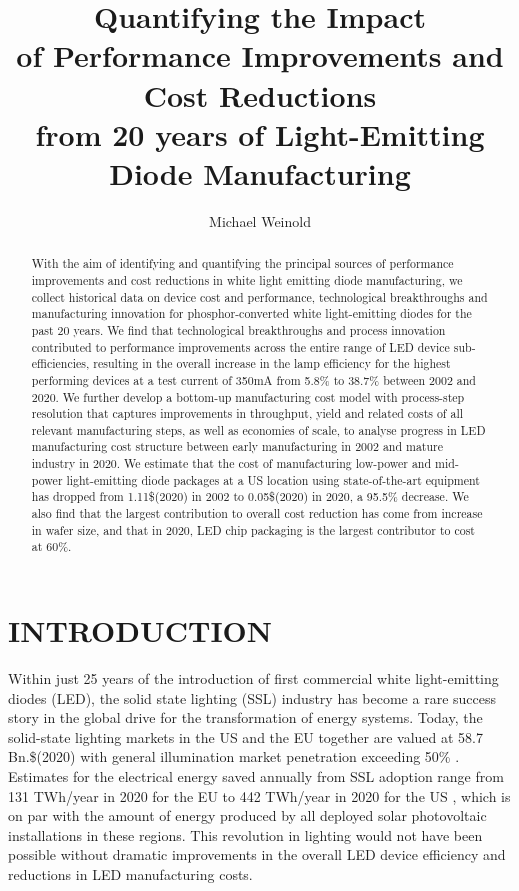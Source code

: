\documentclass[a4paper,nocompress]{spie}  %
\title{Quantifying the Impact \\ of Performance Improvements and Cost Reductions \\ from 20 years of Light-Emitting Diode Manufacturing}
\author[a,b]{Michael Weinold}
\begin{document}
\maketitle

\begin{abstract}
    
    With the aim of identifying and quantifying the principal sources of performance improvements and cost reductions in white light emitting diode manufacturing, we collect historical data on device cost and performance, technological breakthroughs and manufacturing innovation for phosphor-converted white light-emitting diodes for the past 20 years. We find that technological breakthroughs and process innovation contributed to performance improvements across the entire range of LED device sub-efficiencies, resulting in the overall increase in the lamp efficiency for the highest performing devices at a test current of 350mA from 5.8\% to 38.7\% between 2002 and 2020. We further develop a bottom-up manufacturing cost model with process-step resolution that captures improvements in throughput, yield and related costs of all relevant manufacturing steps, as well as economies of scale, to analyse progress in LED manufacturing cost structure between early manufacturing in 2002 and mature industry in 2020. We estimate that the cost of manufacturing low-power and mid-power light-emitting diode packages at a US location using state-of-the-art equipment has dropped from 1.11\$(2020) in 2002 to 0.05\$(2020) in 2020, a 95.5\% decrease. We also find that the largest contribution to overall cost reduction has come from increase in wafer size, and that in 2020, LED chip packaging is the largest contributor to cost at 60\%.

\end{abstract}


\section{INTRODUCTION}
\label{sec:intro}


    Within just 25 years of the introduction of first commercial white light-emitting diodes (LED), the solid state lighting (SSL) industry has become a rare success story in the global drive for the transformation of energy systems. Today, the solid-state lighting markets in the US and the EU together are valued at 58.7 Bn.\$(2020) \cite{gvr2020market_us,gvr2020market_eu} with general illumination market penetration exceeding 50\% \cite{eu2019impactass,stratunl2018}. Estimates for the electrical energy saved annually from SSL adoption range from 131 TWh/year in 2020 for the EU \cite{eu2019impactass} to 442 TWh/year in 2020 for the US \cite{yamada2015adoption,guidehouse2020adoption}, which is on par with the amount of energy produced by all deployed solar photovoltaic installations in these regions. This revolution in lighting would not have been possible without dramatic improvements in the overall LED device efficiency and reductions in LED manufacturing costs.
\end{document}
